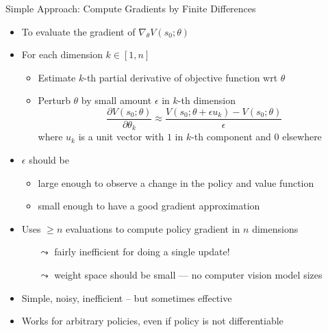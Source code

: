 \documentclass[aspectratio=169]{../latex_main/tntbeamer}  %
\begin{document}
\begin{frame}[c]{Simple Approach: Compute Gradients by Finite Differences}

        \vspace{-1em}
	\begin{itemize}
		\item To evaluate the gradient of $\nabla_\theta V(s_0; \theta)$
		\item For each dimension $k\in [1,n]$
		\begin{itemize}
			\item Estimate $k$-th partial derivative of objective function wrt $\theta$
			\item Perturb $\theta$ by small amount $\epsilon$ in $k$-th dimension
			$$\frac{\partial V(s_0; \theta)}{\partial \theta_k} \approx \frac{V(s_0; \theta + \epsilon u_k) - V(s_0; \theta)}{\epsilon} $$
			where $u_k$ is a unit vector with $1$ in $k$-th component and $0$ elsewhere
		\end{itemize}
		\pause
		\item $\epsilon$ should be
		\begin{itemize}
			\item large enough to observe a change in the policy and value function
			\item small enough to have a good gradient approximation
		\end{itemize}
		\pause
		\item Uses $\geq n$ evaluations to compute policy gradient in $n$ dimensions
		\begin{itemize}
			\item[$\leadsto$] fairly inefficient for doing a single update!
			\item[$\leadsto$] weight space should be small --- no computer vision model sizes
		\end{itemize}
		\pause
		\item Simple, noisy, inefficient -- but sometimes effective
		\item Works for arbitrary policies, even if policy is not differentiable
	\end{itemize}
	
\end{frame}
\end{document}
